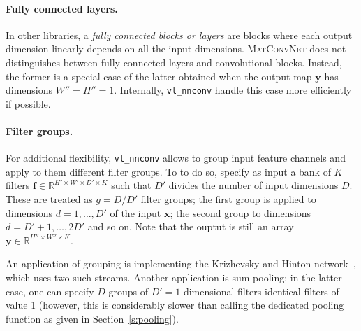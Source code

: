 \documentclass[12pt]{article}
\newcommand{\real}{\mathbb{R}}
\newcommand{\vlnn}{\textsc{MatConvNet}\xspace}
\newcommand{\bx}{\mathbf{x}}
\newcommand{\by}{\mathbf{y}}
\newcommand{\bff}{\mathbf{f}}
\begin{document}
\paragraph{Fully connected layers.} In other libraries, a \emph{fully connected blocks or layers} are blocks where each output dimension linearly depends on all the input dimensions. \vlnn does not distinguishes between fully connected layers and convolutional blocks. Instead, the former is a special case of the latter obtained when the output map $\by$ has dimensions $W''=H''=1$. Internally, \verb!vl_nnconv! handle this case more efficiently if possible.

\paragraph{Filter groups.} For additional flexibility, \verb!vl_nnconv! allows to group input feature channels and apply to them different filter groups. To to do so, specify as input a bank  of $K$ filters $\bff\in\real^{H'\times W'\times D'\times K}$ such that $D'$ divides the number of input dimensions $D$. These are treated as $g=D/D'$ filter groups; the first group is applied to dimensions $d=1,\dots,D'$ of the input $\bx$; the second group to dimensions $d=D'+1,\dots,2D'$ and so on. Note that the ouptut is still an array $\by\in\real^{H''\times W''\times K}$.

An application of grouping is implementing the Krizhevsky and Hinton network~\cite{krizhevsky12imagenet}, which uses two such streams. Another application is sum pooling; in the latter case, one can specify $D$ groups of $D'=1$ dimensional filters identical filters of value 1 (however, this is considerably slower than calling the dedicated pooling function as given in Section~\ref{s:pooling}).
\end{document}
